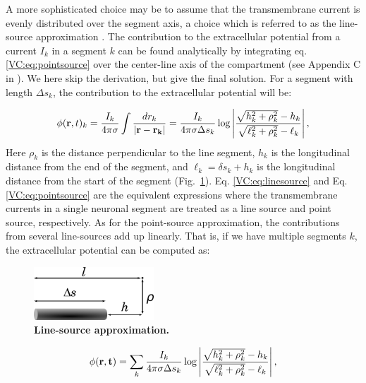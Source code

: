 A more sophisticated choice may be to assume that the transmembrane current is evenly distributed over the segment axis, a choice which is referred to as the line-source approximation \citep{Holt1999, Linden2014}. The contribution to the extracellular potential from a current $I_k$ in a segment $k$ can be found analytically by integrating eq. \ref{VC:eq:pointsource} over the center-line axis of the compartment (see Appendix C in \citep{Holt1998}). We here skip the derivation, but give the final solution. For a segment with length $\Delta s_k$, the contribution to the extracellular potential will be:

\begin{equation}
\phi({\bf r},t)_k = \frac{I_k}{4\pi \sigma} \int \frac{dr_k}{|{\bf r-r_k}|} = 
\frac{I_k}{4\pi \sigma \Delta s_k} \log \left| \frac{\sqrt{h_k^2+\rho_k^2}-h_k}{\sqrt{\ell_k^2+\rho_k^2}-\ell_k} \right|,
\label{VC:eq:linesource}
\end{equation}
Here $\rho_k$ is the distance perpendicular to the line segment, $h_k$ is the longitudinal distance from the end of the segment, and $\ell_k = \delta s_k + h_k$ is the longitudinal distance from the start of the segment (Fig.~\ref{VC:fig:line_source_illustration}). Eq. \ref{VC:eq:linesource} and Eq. \ref{VC:eq:pointsource} are the equivalent expressions where the transmembrane currents in a single neuronal segment are treated as a line source and point source, respectively. As for the point-source approximation, the contributions from several line-sources add up linearly. That is, if we have multiple segments $k$, the extracellular potential can be computed as:
\begin{figure}[!ht]
\begin{center}
\includegraphics[width=0.4\textwidth]{Figures/VC/line_source_illustration.png}
\end{center}
\caption{\textbf{Line-source approximation.} 
\citep{Holt1998} 
}
\label{VC:fig:line_source_illustration}
\end{figure}

\begin{equation}
\phi({\bf r},{\bf t}) = \sum_k \frac{I_k}{4\pi \sigma \Delta s_k} \log \left| \frac{\sqrt{h_k^2+\rho_k^2}-h_k}{\sqrt{\ell_k^2+\rho_k^2}-\ell_k} \right|,
\label{VC:eq:linesources}
\end{equation}

